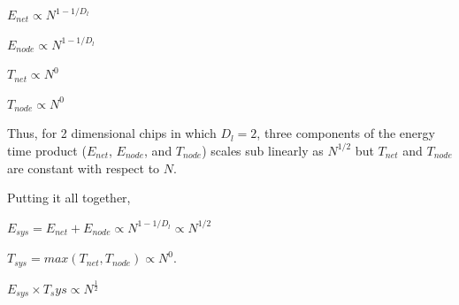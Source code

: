 \documentclass[12pt]{article}
\begin{document}
$E_{net} \propto N^{1-1/D_l}$

$E_{node} \propto N^{1-1/D_l}$

$T_{net} \propto N^0$

$T_{node} \propto N^{0}$

Thus, for 2 dimensional chips in which $D_l = 2$, three components of the
energy time product ($E_{net}$, $E_{node}$, and $T_{node}$) scales sub linearly
as $N^{1/2}$ but $T_{net}$ and $T_{node}$ are constant with respect to $N$.


Putting it all together, 

$E_{sys} = E_{net} + E_{node} \propto N^{1-1/D_l} \propto N^{1/2}$ 

$T_{sys}  = max(T_{net}, T_{node}) \propto N^0$.

$E_{sys} \times T_sys \propto N^{\frac{1}{2}}$
%
%
%
%
\end{document}
